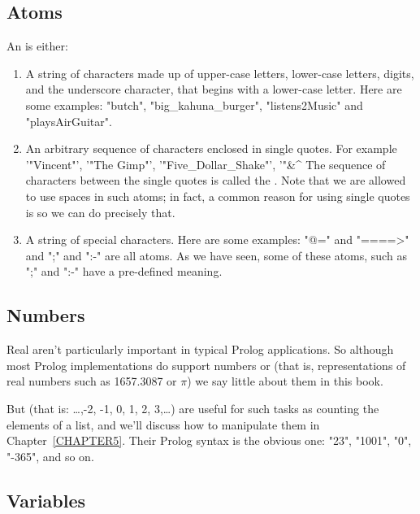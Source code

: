 \subsection*{Atoms}\label{SUBSEC.L1.ATOMS}

An  is either:

\begin{enumerate}
\item{}A string of characters made up of upper-case letters,
  lower-case letters, digits, and the underscore character, that
  begins with a lower-case letter.  Here are some examples: "butch",
  "big_kahuna_burger", "listens2Music" and "playsAirGuitar".
\item{}An arbitrary sequence of characters enclosed in single quotes.
  For example '"Vincent"', '"The Gimp"', '"Five_Dollar_Shake"',
  '"\&^%
  The sequence of characters between the single quotes is called the .
  Note that we are allowed to use spaces in such
  atoms; in fact, a common reason for using single quotes is so we
  can do precisely that.
\item{}A string of special characters.  Here are some examples: "@=" and
  "====>" and ";" and ":-" are all atoms.  As we have seen, some of
  these atoms, such as ";" and ":-" have a pre-defined meaning.
\end{enumerate}


\subsection*{Numbers}\label{SUBSEC.L1.NUMBERS}


Real  aren't particularly important in typical Prolog
applications.  So although most Prolog implementations do support
 numbers or  (that is,
representations of real numbers such as 1657.3087 or $\pi$) we say
little about them in this book.

But  (that is: \ldots,-2, -1, 0, 1, 2, 3,\ldots) are
useful for such tasks as counting the elements of a list, and we'll
discuss how to manipulate them in Chapter~\ref{CHAPTER5}. Their Prolog
syntax is the obvious one: "23", "1001", "0", "-365", and so on.


\subsection*{Variables}\label{SUBSEC.L1.VARS}


